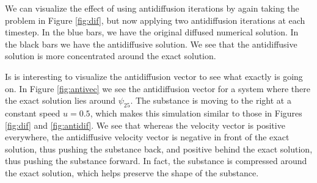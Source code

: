 \documentclass[10pt, a4paper]{article}
\begin{document}
We can visualize the effect of using antidiffusion iterations by again taking the problem in Figure \ref{fig:dif}, but now applying two antidiffusion iterations at each timestep. In the blue bars, we have the original diffused numerical solution. In the black bars we have the antidiffusive solution. We see that the antidiffusive solution is more concentrated around the exact solution.

Is is interesting to visualize the antidiffusion vector to see what exactly is going on. In Figure \ref{fig:antivec} we see the antidiffusion vector for a system where there the exact solution lies around $\psi_{25}$. The substance is moving to the right at a constant speed $u=0.5$, which makes this simulation similar to those in Figures \ref{fig:dif} and \ref{fig:antidif}. We see that whereas the velocity vector is positive everywhere, the antidiffusive velocity vector is negative in front of the exact solution, thus pushing the substance back, and positive behind the exact solution, thus pushing the substance forward. In fact, the substance is compressed around the exact solution, which helps preserve the shape of the substance.
\end{document}
